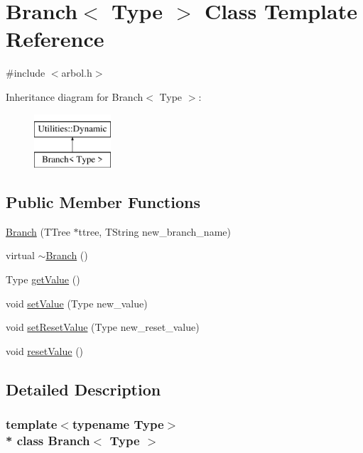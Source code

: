\hypertarget{classBranch}{}\section{Branch$<$ Type $>$ Class Template Reference}
\label{classBranch}


{\ttfamily \#include $<$arbol.\+h$>$}

Inheritance diagram for Branch$<$ Type $>$\+:\begin{figure}[H]
\begin{center}
\leavevmode
\includegraphics[height=2.000000cm]{classBranch}
\end{center}
\end{figure}
\subsection*{Public Member Functions}
\begin{DoxyCompactItemize}
\item 
\hyperlink{classBranch_aeb963f83cf85bbcdef023ddbc020a46a}{Branch} (T\+Tree $\ast$ttree, T\+String new\+\_\+branch\+\_\+name)
\item 
virtual \hyperlink{classBranch_a75022b7e676e5f675b98c1bf7922dd4e}{$\sim$\+Branch} ()
\item 
Type \hyperlink{classBranch_abe830de2e0e7c0df57fdb51436631e1e}{get\+Value} ()
\item 
void \hyperlink{classBranch_abe26b3df8dc53eeb1770d853a39865b1}{set\+Value} (Type new\+\_\+value)
\item 
void \hyperlink{classBranch_a390e9610f26ce93743237dbe3695b4c1}{set\+Reset\+Value} (Type new\+\_\+reset\+\_\+value)
\item 
void \hyperlink{classBranch_aff52fd008db1471e60107522bc62dfb7}{reset\+Value} ()
\end{DoxyCompactItemize}


\subsection{Detailed Description}
\subsubsection*{template$<$typename Type$>$\\*
class Branch$<$ Type $>$}

